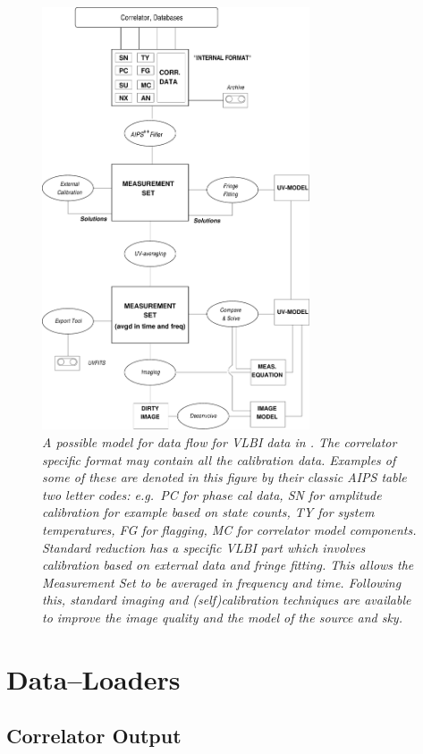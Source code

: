 \begin{figure}
     \begin{center}
     \includegraphics[height=12.5cm]{aipspp}
     \end{center}
     \caption[aipsflow]{\label{flow}\sl A possible model for data
       flow for VLBI data in \aipspp.  The correlator specific format
       may contain all the calibration data.  Examples of some of
       these are denoted in this figure by their classic AIPS table
       two letter codes: e.g.\ PC for phase cal data, SN for amplitude
       calibration for example based on state counts, TY for system
       temperatures, FG for flagging, MC for correlator model
       components. Standard reduction has a specific VLBI part which
       involves calibration based on external data and fringe fitting.
       This allows the Measurement Set to be averaged in frequency and
       time. Following this, standard imaging and (self)calibration
       techniques are available to improve the image quality and the
       model of the source and sky.}

\end{figure}

\section{Data--Loaders}

\subsection{Correlator Output}

